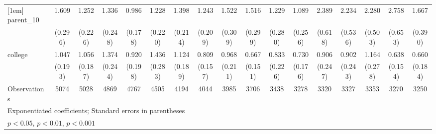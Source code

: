 {\begin{tabular}{l*{16}{c}}
[1em]
parent\_10           &       1.609\sym{**} &       1.252         &       1.336         &       0.986         &       1.228         &       1.398\sym{*}  &       1.243         &       1.522\sym{*}  &       1.516\sym{*}  &       1.229         &       1.089         &       2.389\sym{***}&       2.234\sym{***}&       2.280\sym{***}&       2.758\sym{***}&       1.667\sym{*}  \\
                    &     (0.296)         &     (0.226)         &     (0.248)         &     (0.178)         &     (0.220)         &     (0.214)         &     (0.209)         &     (0.309)         &     (0.299)         &     (0.280)         &     (0.256)         &     (0.618)         &     (0.536)         &     (0.503)         &     (0.653)         &     (0.390)         \\
[1em]
college             &       1.047         &       1.056         &       1.374         &       0.920         &       1.436         &       1.124         &       0.809         &       0.968         &       0.667         &       0.833         &       0.730         &       0.906         &       0.902         &       1.164         &       0.638         &       0.660         \\
                    &     (0.193)         &     (0.187)         &     (0.244)         &     (0.198)         &     (0.283)         &     (0.189)         &     (0.157)         &     (0.211)         &     (0.151)         &     (0.226)         &     (0.176)         &     (0.247)         &     (0.243)         &     (0.278)         &     (0.154)         &     (0.184)         \\
\hline
Observations        &        5074         &        5028         &        4869         &        4767         &        4505         &        4194         &        4044         &        3985         &        3706         &        3438         &        3278         &        3320         &        3327         &        3353         &        3270         &        3250         \\
\hline\hline
\multicolumn{17}{l}{\footnotesize Exponentiated coefficients; Standard errors in parentheses}\\
\multicolumn{17}{l}{\footnotesize \sym{*} \(p<0.05\), \sym{**} \(p<0.01\), \sym{***} \(p<0.001\)}\\
\end{tabular}
}
